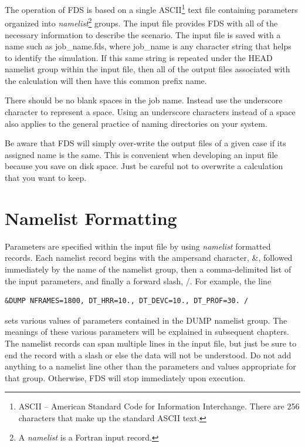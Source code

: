 \documentclass[11pt]{book}
\begin{document}
The operation of FDS is based on a single ASCII\footnote{ASCII -- American Standard Code
for Information Interchange. There are 256 characters that make up the standard ASCII text.} text file containing parameters organized into
{\em namelist}\footnote{A {\em namelist} is a Fortran input record.} groups.
The input file provides FDS  with all of the necessary information to
describe the scenario.
The input file is saved with a name such as {\ct job\_name.fds},
where {\ct job\_name} is any character string that helps to identify
the simulation. If this same string is repeated under the {\ct HEAD} namelist group within the
input file, then all of the output files associated with the calculation will then have this common prefix name.

There should be no blank spaces in the job name. Instead use the underscore
character to represent a space.  Using an underscore characters instead of a space also applies
to the general practice of naming directories on your system.

Be aware that FDS will simply over-write the output files of a given case if its assigned
name is the same. This is convenient when developing an input file because you save on disk space. Just be careful
not to overwrite a calculation that you want to keep.



\section{Namelist Formatting}

Parameters are specified within the input file by using {\em namelist} formatted records. Each namelist record begins with the ampersand character, {\ct \&}, followed immediately by the name of the namelist group, then a comma-delimited list of the input parameters, and finally a forward slash, {\ct /}. For example, the line
\begin{lstlisting}
&DUMP NFRAMES=1800, DT_HRR=10., DT_DEVC=10., DT_PROF=30. /
\end{lstlisting}
sets various values of parameters contained in the {\ct DUMP} namelist group. The meanings of these various parameters will be explained in subsequent chapters. The namelist records can span multiple lines in the input file, but just be sure to end the record with a slash or else the data will not be understood. Do not add anything to a namelist line other than the parameters and values appropriate for that group. Otherwise, FDS will stop immediately upon execution.
\end{document}
